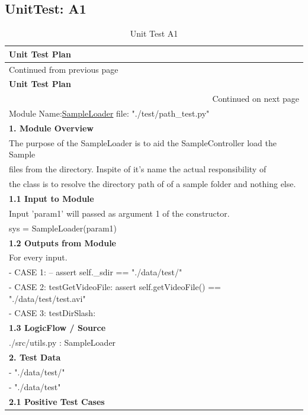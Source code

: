 \documentclass[12pt,a4paper,man]{report}
\begin{document}
\subsection{UnitTest: A1}
\label{sec:org742caf5}

\begin{longtable}{|p{7in}|}
\caption{\label{table:utest_a1}
Unit Test A1}
\\
\hline
\textbf{Unit Test Plan} \cellcolor{blue!25}\\
\hline
\endfirsthead
\multicolumn{1}{l}{Continued from previous page} \\
\hline

\textbf{Unit Test Plan} \cellcolor{blue!25} \\

\hline
\endhead
\hline\multicolumn{1}{r}{Continued on next page} \\
\endfoot
\endlastfoot
\hline
\hline
Module Name:\underline{SampleLoader} \hspace{2in}  file:  "./test/path\_test.py"\\
\hline
\textbf{1. Module Overview}\\
\hline
The purpose of the SampleLoader is to aid the SampleController load the Sample\\
files from the directory. Inspite of it's name the actual responsibility  of\\
the class is to resolve the directory path of of a sample folder and nothing else.\\
\hline
\textbf{1.1 Input to Module}\\
\hline
Input 'param1' will passed as argument 1 of the constructor.\\
sys = SampleLoader(param1)\\
\hline
\textbf{1.2 Outputs from Module}\\
\hline
For every input.\\
- CASE 1:  -- assert self.\_sdir == "./data/test/"\\
- CASE 2: testGetVideoFile: assert self.getVideoFile() == "./data/test/test.avi"\\
- CASE 3: testDirSlash:\\
\hline
\textbf{1.3 LogicFlow / Source}\\
\hline
./src/utils.py : SampleLoader\\
\hline
\textbf{2. Test Data}\\
\hline
- "./data/test/"\\
- "./data/test"\\
\hline
\textbf{2.1 Positive Test Cases}\\

\end{longtable}
\end{document}
